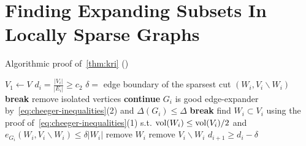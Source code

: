 \section{Finding Expanding Subsets In Locally Sparse Graphs}

\begin{algorithm}
    \caption{Algorithmic proof of~\autoref{thm:kri} (\cite{kri17})}
    \label{alg:kri}
    \begin{algorithmic}
        \State $V_1\gets V$
            \State $d_i=\frac{|V_i|}{|E_i|}\geq c_2$
            \State $\delta=$ edge boundary of the sparsest cut $(W_i, V_i\backslash W_i)$
                \State \textbf{break}
                \State remove isolated vertices
                \State \textbf{continue}
                \State $G_i$ is good edge-expander by~\eqref{eq:cheeger-inequalities}(2)
                \State and $\Delta(G_i)\leq\Delta$
                \State \textbf{break}
            \Else
                \State find $W_i\subset V_i$ using the proof of~\eqref{eq:cheeger-inequalities}(1)
                \State s.t. $\operatorname*{vol}(W_i)\leq\operatorname*{vol}(V_i)/2$
                \State and $e_{G_i}(W_i,V_i\backslash W_i)\leq \delta|W_i|$
                    \State remove $W_i$
                \Else{}
                    \State remove $V_i\backslash W_i$
                    \State $d_{i+1}\geq d_i-\delta$
                \EndIf
            \EndIf
        \EndFor
        \EndProcedure
    \end{algorithmic}
\end{algorithm}
